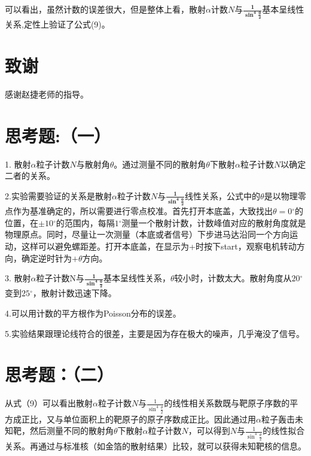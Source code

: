 \documentclass{article}
\begin{document}
可以看出，虽然计数的误差很大，但是整体上看，散射$\alpha$计数$N$与$\frac{\mathbf{1}}{\mathbf{\sin}^{\mathbf{4}}\frac{\mathbf{\theta}}{\mathbf{2}}}$基本呈线性关系,定性上验证了公式(9)。
\section{致谢}
    感谢赵捷老师的指导。 
    \clearpage
    \appendix
    \appendixpage
    \section{思考题:（一）}


1.
散射$\alpha$粒子计数$N$与散射角\(\theta\)。通过测量不同的散射角\(\theta\)下散射$\alpha$粒子计数$N$以确定二者的关系。

2.实验需要验证的关系是散射$\alpha$粒子计数$N$与\(\frac{\mathbf{1}}{\mathbf{\sin}^{\mathbf{4}}\frac{\mathbf{\theta}}{\mathbf{2}}}\)线性关系，公式中的\(\theta\)是以物理零点作为基准确定的，所以需要进行零点校准。首先打开本底盖，大致找出\(\theta = 0{^\circ}\)的位置，在\(\pm 10{^\circ}\)的范围内，每隔\(1{^\circ}\)测量一个散射计数，计数峰值对应的散射角度就是物理原点。同时，尽量让一次测量（本底或者信号）下步进马达沿同一个方向运动，这样可以避免螺距差。打开本底盖，在显示为+时按下start，观察电机转动方向，确定逆时针为\(+ \theta\)方向。

3.
散射$\alpha$粒子计数N\(与\frac{\mathbf{1}}{\mathbf{\sin}^{\mathbf{4}}\frac{\mathbf{\theta}}{\mathbf{2}}}\)基本呈线性关系，\(\theta\)较小时，计数太大。散射角度从\(20{^\circ}\)变到\(25{^\circ}\)，散射计数迅速下降。

4.可以用计数的平方根作为Poisson分布的误差。

5.实验结果跟理论线符合的很差，主要是因为存在极大的噪声，几乎淹没了信号。
\section{思考题：（二）}

从式（9）可以看出散射$\alpha$粒子计数$N$与\(\frac{1}{\sin^{4}\frac{\theta}{2}}\)的线性相关系数既与靶原子序数的平方成正比，又与单位面积上的靶原子的原子序数成正比。因此通过用$\alpha$粒子轰击未知靶，然后测量不同的散射角\(\theta\)下散射$\alpha$粒子计数$N$，可以得到$N$与\(\frac{1}{\sin^{4}\frac{\theta}{2}}\)的线性拟合关系。再通过与标准核（如金箔的散射结果）比较，就可以获得未知靶核的信息。
\end{document}
